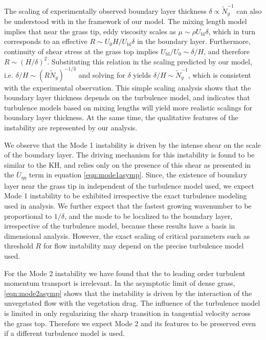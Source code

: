 \documentclass[12pt]{report}   %
\newcommand{\Rey}{{R}}
\newcommand{\Ndg}{\tilde{N}_g}
\newcommand{\ubl}{U_\text{bl}}
\renewcommand{\bar}{\overline}
\begin{document}
The scaling of experimentally observed boundary layer thickness $\delta \propto \Ndg^{-1}$ can also be understood with in the framework of our model. 
The mixing length model implies that near the grass tip, eddy viscosity scales as $\mu \sim \rho \ubl \delta$, which in turn corresponds to an effective $\Rey \sim U_0H/\ubl \delta$ in the boundary layer. Furthermore, continuity of shear stress at the grass top implies $\ubl/U_0 \sim \delta/H$, and therefore $\Rey \sim (H/\delta)^2$. Substituting this relation in the scaling predicted by our model, i.e. $\delta/H \sim (\Rey \Ndg)^{-1/3}$ and solving for $\delta$ yields $\delta/H \sim \Ndg^{-1}$, which is consistent with the experimental observation. This simple scaling analysis shows that the boundary layer thickness depends on the turbulence model, and indicates that turbulence models based on mixing lengths will yield more realistic scalings for boundary layer thickness. At the same time, the qualitative features of the instability are represented by our analysis.

We observe that the Mode 1 instability is driven by the intense shear on the scale of the boundary layer.
The driving mechanism for this instability is found to be similar to the KH, and relies only on the presence of this shear as presented in the $\bar{U}_{\eta\eta}$ term in equation \eqref{eqn:mode1asymp}. Since, the existence of boundary layer near the grass tip in independent of the turbulence model used, we expect Mode 1 instability to be exhibited irrespective the exact turbulence modeling used in analysis. We further expect that the fastest growing wavenumber to be proportional to $1/\delta$, and the mode to be localized to the boundary layer, irrespective of the turbulence model, because these results have a basis in dimensional analysis. However, the exact scaling of critical parameters such as threshold $\Rey$ for flow instability may depend on the precise turbulence model used.

 
For the Mode 2 instability we have found that the to leading order turbulent momentum transport is irrelevant.
In the asymptotic limit of dense grass, \eqref{eqn:mode2asymp} shows that the instability is driven by the interaction of the unvegetated flow with the vegetation drag. The influence of the turbulence model is limited in only regularizing the sharp transition in tangential velocity across the grass top.
Therefore we expect Mode 2 and its features to be preserved even if a different turbulence model is used.
\end{document}
